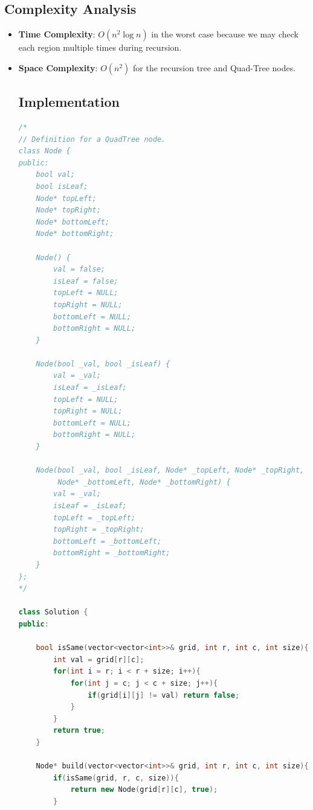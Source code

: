 \subsection*{Complexity Analysis}

\begin{itemize}

\item \textbf{Time Complexity}: $O(n^2 \log n)$ in the worst case because we may check each region multiple times during recursion.

\item \textbf{Space Complexity}: $O(n^2)$ for the recursion tree and Quad-Tree nodes.
\subsection*{Implementation}

\begin{lstlisting}[language=C++,breaklines=true,breakatwhitespace=false,columns=fullflexible,basicstyle=\ttfamily\small]
/*
// Definition for a QuadTree node.
class Node {
public:
    bool val;
    bool isLeaf;
    Node* topLeft;
    Node* topRight;
    Node* bottomLeft;
    Node* bottomRight;
    
    Node() {
        val = false;
        isLeaf = false;
        topLeft = NULL;
        topRight = NULL;
        bottomLeft = NULL;
        bottomRight = NULL;
    }
    
    Node(bool _val, bool _isLeaf) {
        val = _val;
        isLeaf = _isLeaf;
        topLeft = NULL;
        topRight = NULL;
        bottomLeft = NULL;
        bottomRight = NULL;
    }
    
    Node(bool _val, bool _isLeaf, Node* _topLeft, Node* _topRight,
         Node* _bottomLeft, Node* _bottomRight) {
        val = _val;
        isLeaf = _isLeaf;
        topLeft = _topLeft;
        topRight = _topRight;
        bottomLeft = _bottomLeft;
        bottomRight = _bottomRight;
    }
};
*/

class Solution {
public:

    bool isSame(vector<vector<int>>& grid, int r, int c, int size){
        int val = grid[r][c];
        for(int i = r; i < r + size; i++){
            for(int j = c; j < c + size; j++){
                if(grid[i][j] != val) return false;
            }
        }
        return true;
    }

    Node* build(vector<vector<int>>& grid, int r, int c, int size){
        if(isSame(grid, r, c, size)){
            return new Node(grid[r][c], true);
        }


\end{lstlisting}
\end{itemize}
